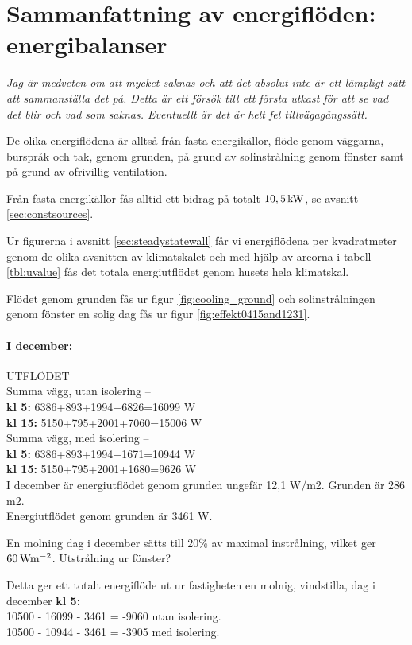 \section{Sammanfattning av energiflöden: energibalanser}

\emph{\color{red} Jag är medveten om att mycket saknas och att det absolut inte är ett lämpligt sätt att sammanställa det på. Detta är ett försök till ett första utkast för att se vad det blir och vad som saknas. Eventuellt är det är helt fel tillvägagångssätt.}

De olika energiflödena är alltså från fasta energikällor, flöde genom väggarna, burspråk och tak, genom grunden, på grund av solinstrålning genom fönster samt på grund av ofrivillig ventilation.

Från fasta energikällor fås alltid ett bidrag på totalt $\unit[10,5]{kW}$, se avsnitt \ref{sec:constsources}.

Ur figurerna i avsnitt \ref{sec:steadystatewall} får vi energiflödena per kvadratmeter genom de olika avsnitten av klimatskalet och med hjälp av areorna i tabell \ref{tbl:uvalue} fås det totala energiutflödet genom husets hela klimatskal.

Flödet genom grunden fås ur figur \ref{fig:cooling_ground} och solinstrålningen genom fönster en solig dag fås ur figur \ref{fig:effekt0415and1231}.


\paragraph{I december:}
UTFLÖDET\\
Summa vägg, utan isolering –\\
\textbf{kl 5:} 6386+893+1994+6826=16099 W\\
\textbf{kl 15:} 5150+795+2001+7060=15006 W\\

Summa vägg, med isolering –\\
\textbf{kl 5:} 6386+893+1994+1671=10944 W\\
\textbf{kl 15:} 5150+795+2001+1680=9626 W\\

I december är energiutflödet genom grunden ungefär 12,1 W/m2. Grunden är 286 m2.\\
Energiutflödet genom grunden är 3461 W.

En molning dag i december sätts till 20\% av maximal instrålning, vilket ger $\unit[60]{Wm^{-2}}$. Utstrålning ur fönster?

Detta ger ett totalt energiflöde ut ur fastigheten en molnig, vindstilla, dag i december \textbf{kl 5:}\\
10500 - 16099 - 3461 = -9060 utan isolering.\\
10500 - 10944 - 3461 = -3905 med isolering.\\

